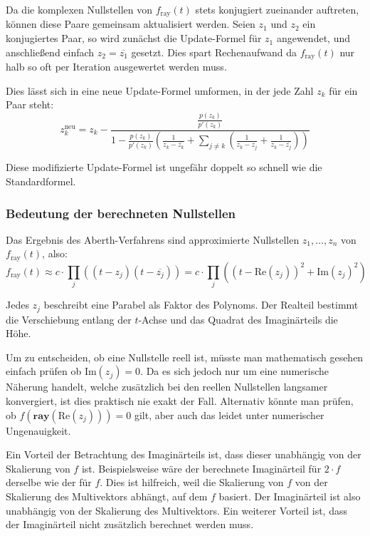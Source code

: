 \documentclass[
	ngerman,%
	accentcolor=9c,%
	ruledheaders=section,%
	class=report,%
	thesis={type=bachelor},%
	fontsize=11pt,%
	parskip=half-,%
	custommargins=true,%
	marginpar=false,%
]{tudapub}
\begin{document}
Da die komplexen Nullstellen von \( f_{\text{ray}}(t) \) stets konjugiert zueinander auftreten, können diese Paare gemeinsam aktualisiert werden. Seien \( z_1 \) und \( z_2 \) ein konjugiertes Paar, so wird zunächst die Update-Formel für \( z_1 \) angewendet, und anschließend einfach \( z_2 = \overline{z_1} \) gesetzt. Dies spart Rechenaufwand da \( f_{\text{ray}}(t) \) nur halb so oft per Iteration ausgewertet werden muss.

Dies lässt sich in eine neue Update-Formel umformen, in der jede Zahl \( z_k \) für ein Paar steht:
\[
z_k^{\text{neu}} = z_k - \frac{\frac{p(z_k)}{p'(z_k)}}{1 - \frac{p(z_k)}{p'(z_k)} \left( \frac{1}{z_k - \overline{z_k}} + \sum_{j \neq k} \left( \frac{1}{z_k - z_j} + \frac{1}{z_k - \overline{z_j}} \right) \right) }
\]

Diese modifizierte Update-Formel ist ungefähr doppelt so schnell wie die Standardformel.

\subsubsection*{Bedeutung der berechneten Nullstellen}

Das Ergebnis des Aberth-Verfahrens sind approximierte Nullstellen \( z_1, \dots, z_n \) von \( f_{\text{ray}}(t) \), also:
\[
f_{\text{ray}}(t) \approx 
c \cdot \prod_j \left( (t - z_j)(t - \overline{z_j}) \right) = 
c \cdot \prod_j \left( (t - \text{Re}(z_j))^2 + \text{Im}(z_j)^2 \right)
\]

Jedes \( z_j \) beschreibt eine Parabel als Faktor des Polynoms. Der Realteil bestimmt die Verschiebung entlang der \( t \)-Achse und das Quadrat des Imaginärteils die Höhe. 


Um zu entscheiden, ob eine Nullstelle reell ist, müsste man mathematisch gesehen einfach prüfen ob \( \text{Im}(z_j) = 0 \). Da es sich jedoch nur um eine numerische Näherung handelt, welche zusätzlich bei den reellen Nullstellen langsamer konvergiert, ist dies praktisch nie exakt der Fall.
Alternativ könnte man prüfen, ob \( f(\mathbf{ray}(\text{Re}(z_j))) = 0 \) gilt, aber auch das leidet unter numerischer Ungenauigkeit.

Ein Vorteil der Betrachtung des Imaginärteils ist, dass dieser unabhängig  
von der Skalierung von \( f \) ist. Beispielsweise wäre der berechnete Imaginärteil für \( 2 \cdot f \)  
derselbe wie der für \( f \). Dies ist hilfreich, weil die Skalierung von \( f \)  
von der Skalierung des Multivektors abhängt, auf dem \( f \) basiert.  
Der Imaginärteil ist also unabhängig von der Skalierung des Multivektors.
Ein weiterer Vorteil ist, dass der Imaginärteil nicht zusätzlich berechnet werden muss.
\end{document}
